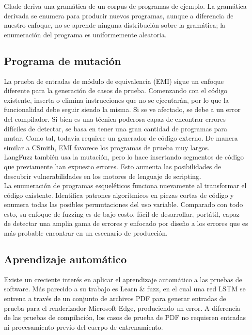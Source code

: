 Glade\cite{Glade:Bastani:Sharma:Aiken:Liang} deriva una gramática de un corpus de programas de ejemplo. La gramática derivada se enumera para producir nuevos programas, aunque a diferencia de nuestro enfoque, no se aprende ninguna distribución sobre la gramática; la enumeración del programa es uniformemente aleatoria.

\subsection{Programa de mutación}
La prueba de entradas de módulo de equivalencia (EMI)\cite{Le:Afshari:Su:Modulo}\cite{Sun:Le:Su:Mutation} sigue un enfoque diferente para la generación de casos de prueba. Comenzando con el código existente, inserta o elimina instrucciones que no se ejecutarán, por lo que la funcionalidad debe seguir siendo la misma. Si se ve afectado, se debe a un error del compilador. Si bien es una técnica poderosa capaz de encontrar errores difíciles de detectar, se basa en tener una gran cantidad de programas para mutar. Como tal, todavía requiere un generador de código externo. De manera similar a CSmith, EMI favorece los programas de prueba muy largos.\\

LangFuzz\cite{Holler:Herzig:Zeller:Fragments} también usa la mutación, pero lo hace insertando segmentos de código que previamente han expuesto errores. Esto aumenta las posibilidades de descubrir vulnerabilidades en los motores de lenguaje de scripting.\\

La enumeración de programas esqueléticos\cite{Zhang:Sun:Su:Skeletal} funciona nuevamente al transformar el código existente. Identifica patrones algorítmicos en piezas cortas de código y enumera todas las posibles permutaciones del uso variable. Comparado con todo esto, su enfoque de fuzzing es de bajo costo, fácil de desarrollar, portátil, capaz de detectar una amplia gama de errores y enfocado por diseño a los errores que es más probable encontrar en un escenario de producción.

\subsection{Aprendizaje automático}
Existe un creciente interés en aplicar el aprendizaje automático a las pruebas de software. Más parecido a su trabajo es Learn \& fuzz\cite{Godefroid:Peleg:Singh:LearnAndFuzz}, en el cual una red LSTM se entrena a través de un conjunto de archivos PDF para generar entradas de prueba para el renderizador Microsoft Edge, produciendo un error. A diferencia de las pruebas de compilación, los casos de prueba de PDF no requieren entradas ni procesamiento previo del cuerpo de entrenamiento.\\

